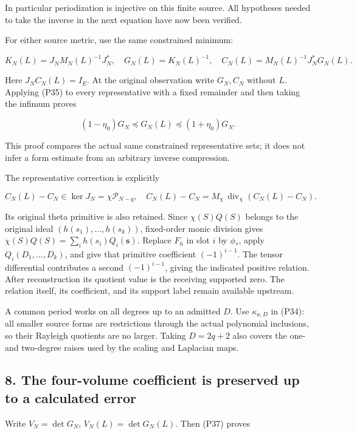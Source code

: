 In particular periodization is injective on this finite source. All hypotheses needed to take the inverse in the next equation have now been verified.

For either source metric, use the same constrained minimum:

\[
K_N(L)=J_NM_N(L)^{-1}J_N^*,\quad
G_N(L)=K_N(L)^{-1},\quad
C_N(L)=M_N(L)^{-1}J_N^*G_N(L).
\tag{P36}
\]

Here \(J_NC_N(L)=I_E\). At the original observation write \(G_N,C_N\) without \(L\). Applying (P35) to every representative with a fixed remainder and then taking the infimum proves

\[
\boxed{(1-\eta_0)G_N\preceq G_N(L)\preceq(1+\eta_0)G_N.}
\tag{P37}
\]

This proof compares the actual same constrained representative sets; it does not infer a form estimate from an arbitrary inverse compression.

The representative correction is explicitly

\[
C_N(L)-C_N\in\ker J_N=\chi\mathcal P_{N-q},
\quad
C_N(L)-C_N=M_\chi\,\operatorname{div}_\chi(C_N(L)-C_N).
\tag{P38}
\]

Its original theta primitive is also retained. Since \(\chi(S)Q(S)\) belongs to the original ideal \((h(s_1),\ldots,h(s_k))\), fixed-order monic division gives \(\chi(S)Q(S)=\sum_i h(s_i)Q_i(\mathbf s)\). Replace \(F_h\) in slot \(i\) by \(\phi_*\), apply \(Q_i(D_1,\ldots,D_k)\), and give that primitive coefficient \((-1)^{i-1}\). The tensor differential contributes a second \((-1)^{i-1}\), giving the indicated positive relation. After reconstruction its quotient value is the receiving supported zero. The relation itself, its coefficient, and its support label remain available upstream.

A common period works on all degrees up to an admitted \(D\). Use \(\kappa_{a,D}\) in (P34): all smaller source forms are restrictions through the actual polynomial inclusions, so their Rayleigh quotients are no larger. Taking \(D=2q+2\) also covers the one- and two-degree raises used by the scaling and Laplacian maps.

\subsection{8. The four-volume coefficient is preserved up to a calculated error}\label{endpoint-periodized_original--the-four-volume-coefficient-is-preserved-up-to-a-calculated-error}

Write \(V_N=\det G_N\), \(V_N(L)=\det G_N(L)\). Then (P37) proves

